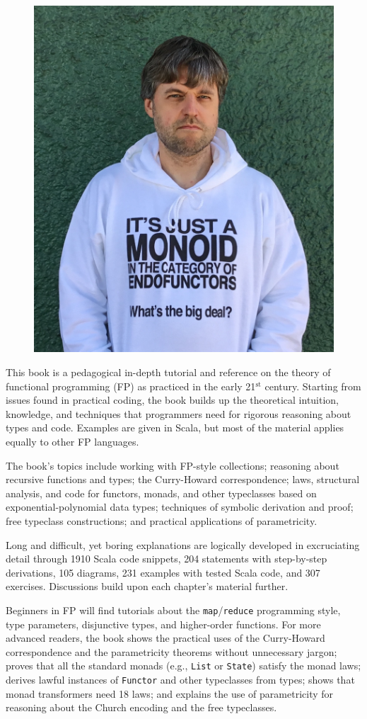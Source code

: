 \onecolumn
\thispagestyle{empty}
 
\begin{figure}
\includegraphics[width=0.4\columnwidth]{monads_evil_face}
\vspace{-2.0\baselineskip}
\end{figure}

\smaller
This book is a pedagogical in-depth tutorial and reference
on the theory of functional programming (FP) as practiced in the early
21$^{\text{st}}$ century. Starting from issues found in practical
coding, the book builds up the theoretical intuition, knowledge, and
techniques that programmers need for rigorous reasoning about types
and code. Examples are given in Scala, but most of the material applies equally
to other FP languages.

The book\textsf{'}s topics include working with FP-style collections; reasoning about recursive
functions and types; the Curry-Howard correspondence; laws, structural
analysis, and code for functors, monads, and other typeclasses based on exponential-polynomial data types; 
techniques of symbolic derivation and proof;
free typeclass constructions; and
practical applications of parametricity.

Long and difficult, yet boring explanations are logically
developed in excruciating detail through 1910
Scala code snippets, 204 statements with step-by-step
derivations, 105 diagrams, 231 examples
with tested Scala code, and 307 exercises. Discussions
build upon each chapter\textsf{'}s material further.

Beginners in FP will find tutorials about the \texttt{map}/\texttt{reduce}
programming style, type parameters, disjunctive types, and higher-order
functions. For more advanced readers, the book shows  the practical
uses of the Curry-Howard correspondence and the parametricity theorems
without unnecessary jargon; proves that all the standard monads (e.g.,
\texttt{List} or \texttt{State})
satisfy the monad laws; derives lawful instances of \texttt{Functor}
and other typeclasses from types; shows that monad transformers need
18 laws;
and explains the use of parametricity for reasoning about the Church encoding and the free typeclasses.

